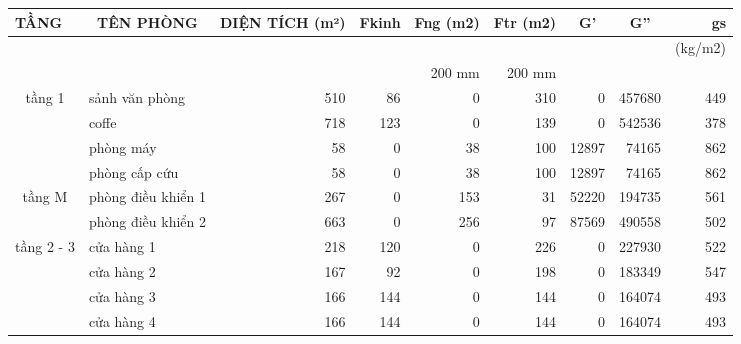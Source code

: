 \begin{landscape}
\begin{table}[H]
	\centering
	\begin{tabular}{|c|l|r|r|r|r|r|r|r|}
		\hline
		\multicolumn{1}{|l|}{\textbf{ TẦNG}} & \multicolumn{1}{c|}{\textbf{TÊN PHÒNG}} & \multicolumn{1}{p{4.93em}|}{\textbf{DIỆN TÍCH (m²) }} & \multicolumn{1}{p{4.855em}|}{\textbf{Fkinh}} & \multicolumn{1}{p{5.215em}|}{\textbf{Fng (m2)}} & \multicolumn{1}{p{5.07em}|}{\textbf{Ftr (m2)}} & \multicolumn{1}{c|}{\textbf{G'}} & \multicolumn{1}{c|}{\textbf{G''}} & \multicolumn{1}{p{4.07em}|}{\textbf{gs}} \bigstrut\\
		\hline
		&          &          &          &          &          &          &          & \multicolumn{1}{p{4.07em}|}{(kg/m2)} \bigstrut\\
		\hline
		&          &          &          & \multicolumn{1}{p{5.215em}|}{200 mm} & \multicolumn{1}{p{5.07em}|}{200 mm} &          &          &  \bigstrut\\
		\hline
		\multirow{4}[8]{*}{tầng 1} & sảnh văn phòng & 510      & 86       & 0        & 310      & 0        & 457680   & 449 \bigstrut\\
		\cline{2-9}         & coffe    & 718      & 123      & 0        & 139      & 0        & 542536   & 378 \bigstrut\\
		\cline{2-9}         & phòng máy & 58       & 0        & 38       & 100      & 12897    & 74165    & 862 \bigstrut\\
		\cline{2-9}         & phòng cấp cứu & 58       & 0        & 38       & 100      & 12897    & 74165    & 862 \bigstrut\\
		\hline
		\multirow{2}[4]{*}{tầng M} & phòng điều khiển 1 & 267      & 0        & 153      & 31       & 52220    & 194735   & 561 \bigstrut\\
		\cline{2-9}         & phòng điều khiển 2 & 663      & 0        & 256      & 97       & 87569    & 490558   & 502 \bigstrut\\
		\hline
		\multirow{6}[12]{*}{tầng 2 - 3} & cửa hàng 1 & 218      & 120      & 0        & 226      & 0        & 227930   & 522 \bigstrut\\
		\cline{2-9}         & cửa hàng 2 & 167      & 92       & 0        & 198      & 0        & 183349   & 547 \bigstrut\\
		\cline{2-9}         & cửa hàng 3 & 166      & 144      & 0        & 144      & 0        & 164074   & 493 \bigstrut\\
		\cline{2-9}         & cửa hàng 4 & 166      & 144      & 0        & 144      & 0        & 164074   & 493 \bigstrut\\

\end{tabular}
\end{table}
\end{landscape}
